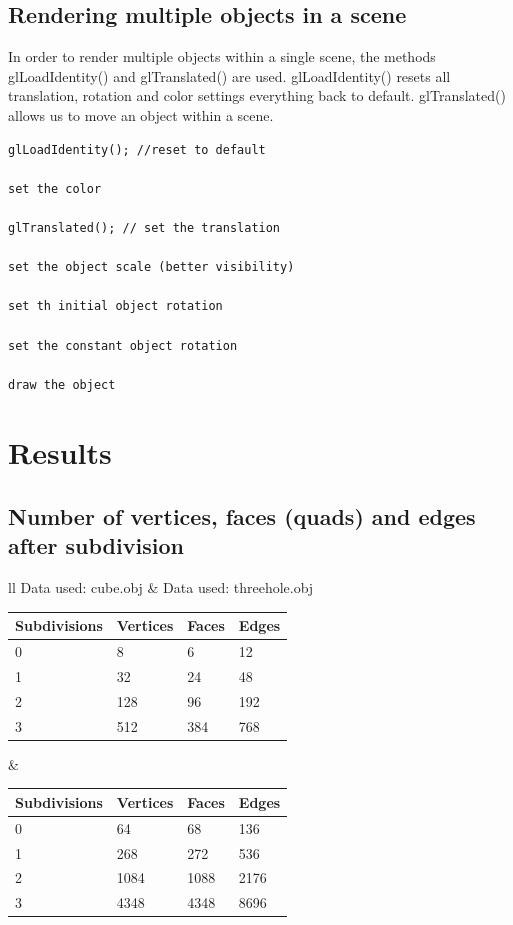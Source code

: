 \documentclass[12pt,a4paper]{scrartcl}
\begin{document}
\subsection{Rendering multiple objects in a scene}
In order to render multiple objects within a single scene, the methods glLoadIdentity() and glTranslated() are used.
glLoadIdentity() resets all translation, rotation and color settings everything back to default. glTranslated() allows us to move an object within a scene.
\begin{lstlisting}[language=PSEUDO]
glLoadIdentity(); //reset to default

set the color

glTranslated(); // set the translation

set the object scale (better visibility)

set th initial object rotation

set the constant object rotation

draw the object
\end{lstlisting}


\section{Results}
\subsection{Number of vertices, faces (quads) and edges after subdivision}

\begin{tabular}{ll}
	Data used: cube.obj & Data used: threehole.obj \\
	\begin{tabular}{|l|l|l|l|}
		\hline
		Subdivisions & Vertices & Faces & Edges \\
		\hline
		0 & 8 & 6 & 12 \\
		\hline
		1 & 32 & 24 & 48 \\
		\hline
		2 & 128 & 96 & 192 \\
		\hline
		3 & 512 & 384 & 768 \\
		\hline
	\end{tabular}
	&
	\begin{tabular}{|l|l|l|l|}
		\hline
		Subdivisions & Vertices & Faces & Edges \\
		\hline
		0 & 64 & 68 & 136 \\
		\hline
		1 & 268 & 272 & 536 \\
		\hline
		2 & 1084 & 1088 & 2176 \\
		\hline
		3 & 4348 & 4348 & 8696 \\
		\hline
	\end{tabular}
	\\
\end{tabular}
\end{document}

